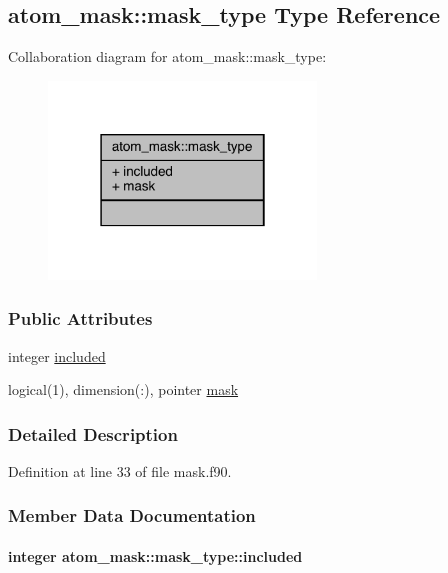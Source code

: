 \hypertarget{structatom__mask_1_1mask__type}{\subsection{atom\-\_\-mask\-:\-:mask\-\_\-type Type Reference}
\label{structatom__mask_1_1mask__type}
}


Collaboration diagram for atom\-\_\-mask\-:\-:mask\-\_\-type\-:
\nopagebreak
\begin{figure}[H]
\begin{center}
\leavevmode
\includegraphics[width=202pt]{structatom__mask_1_1mask__type__coll__graph}
\end{center}
\end{figure}
\subsubsection*{Public Attributes}
\begin{DoxyCompactItemize}
\item 
integer \hyperlink{structatom__mask_1_1mask__type_a39003523aa6d819f29580ddaf22c99d4}{included}
\item 
logical(1), dimension(\-:), pointer \hyperlink{structatom__mask_1_1mask__type_a9b592dd0db7db095d29e22fe4a808fad}{mask}
\end{DoxyCompactItemize}


\subsubsection{Detailed Description}


Definition at line 33 of file mask.\-f90.



\subsubsection{Member Data Documentation}
\hypertarget{structatom__mask_1_1mask__type_a39003523aa6d819f29580ddaf22c99d4}{
\paragraph[{included}]{\setlength{\rightskip}{0pt plus 5cm}integer atom\-\_\-mask\-::mask\-\_\-type\-::included}}\label{structatom__mask_1_1mask__type_a39003523aa6d819f29580ddaf22c99d4}


